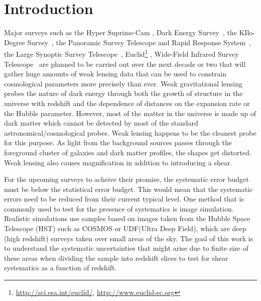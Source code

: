 \documentclass[twocolumn,useAMS,usenatbib]{mn2e}
\newcommand{\rachel}[1]{}
\begin{document}
\section{Introduction}
\label{S:intro}

Major surveys such as the Hyper Suprime-Cam \citep[HSC;][]{HSC_Overview}, Dark Energy Survey~\citep[DES;][]{DESC}, the KIlo-Degree Survey~\citep[KIDS;][]{KIDS}, the Panoramic Survey Telescope and Rapid Response System~\citep[PanSTARRS;][]{PanSTARRS_2010},
the Large Synoptic Survey Telescope~\citep[LSST;][]{LSST_Book}, Euclid\footnote{\url{http://sci.esa.int/euclid/}, \url{http://www.euclid-ec.org}} \citep{EuclidReport},
Wide-Field Infrared Survey Telescope~\citep[WFIRST;][]{WFIRST_Final}
are planned to be carried out over the next decade or two that will gather huge amounts of weak lensing data that can be used to constrain cosmological parameters more precisely than ever.
Weak gravitational lensing probes the nature of dark energy through both the growth of structure in the universe with redshift and the dependence of distances on the expansion rate or the Hubble parameter.
However, most of the matter in the universe is made up of dark matter which cannot be detected by most of the standard astronomical/cosmological probes. Weak lensing happens to be the cleanest probe for this purpose.
As light from the background sources passes through the foreground cluster of galaxies and dark matter profiles, the shapes get distorted. Weak lensing also causes magnification in addition to introducing a shear.

For the upcoming surveys to acheive their promise, the systematic error budget must be below the statistical error budget. This would mean that the systematic errors need to be reduced from their current typical level.
One method that is commonly used to test for the presence of systematics is image simulation. Realistic simulations use samples based on images taken from the Hubble Space Telescope (HST) such as COSMOS or UDF(Ultra Deep Field), which are deep (high redshift) surveys taken over small areas of the sky.
The goal of this work is to understand the systematic uncertainties that might arise due to finite size of these areas when dividing the sample into redshift slices to test for 
shear systematics as a function of redshift.
\end{document}

